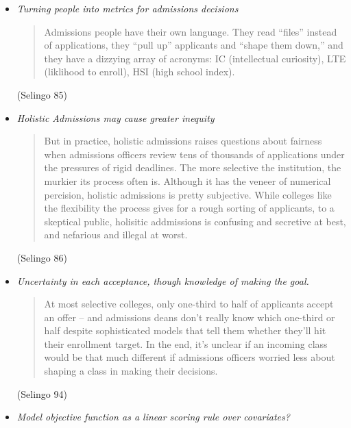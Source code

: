 \documentclass[10pt]{article}
\begin{document}
{\begin{itemize}
\begin{quote}
	Sellers make up a fiarly small number of four-year colleges and universities, less than 10 percent. The vast majority of schools are somewhere on the spectrum of buyers. On average, sellers admit just 20 percent of applicants, while colleges as a whole admit two-thirds. When sellers make an offer, nearly 45 percent of students accept, compared with a quarter for buyers. And only 7 percent of the financial aid sellers give out to students is a merit-based discount, compared with nearly one-third of aid at buyers.
	\end{quote}
	(Selingo 49,50)
	\item \textit{Turning people into metrics for admissions decisions}
	\begin{quote}
	Admissions people have their own language. They read ``files'' instead of applications, they ``pull up'' applicants and ``shape them down,'' and they have a dizzying array of acronyms: IC (intellectual curiosity), LTE (liklihood to enroll), HSI (high school index).
	\end{quote}
	(Selingo 85)
	\item \textit{Holistic Admissions may cause greater inequity}
	\begin{quote}
	But in practice, holistic admissions raises questions about fairness when admissions officers review tens of thousands of applications under the pressures of rigid deadlines. The more selective the institution, the murkier its process often is. Although it has the veneer of numerical percision, holistic admissions is pretty subjective. While colleges like the flexibility the process gives for a rough sorting of applicants, to a skeptical public, holisitic addmissions is confusing and secretive at best, and nefarious and illegal at worst.
	\end{quote}
	(Selingo 86)
	\item \textit{Uncertainty in each acceptance, though knowledge of making the goal.}
	\begin{quote}
	At most selective colleges, only one-third to half of applicants accept an offer -- and admissions deans don't really know which one-third or half despite sophisticated models that tell them whether they'll hit their enrollment target. In the end, it's unclear if an incoming class would be that much different if admissions officers worried less about shaping a class in making their decisions.
	\end{quote}
	(Selingo 94)
	\item \textit{Model objective function as a linear scoring rule over covariates?}

\end{itemize}}
\end{document}
